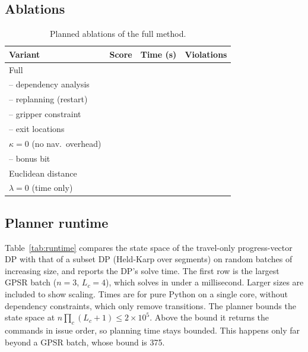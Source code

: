 \documentclass[conference]{IEEEtran}
\newcommand{\X}{}
\newcommand{\X}{\textcolor{red}{XX}}
\begin{document}
\subsection{Ablations}
\begin{table}[t]
\centering
\caption{Planned ablations of the full method.}
\label{tab:ablation}
\small
\begin{tabular}{lccc}
\toprule
Variant & Score & Time (s) & Violations \\
\midrule
Full                            & \X & \X & \X \\
-- dependency analysis          & \X & \X & \X \\
-- replanning (restart) & \X & \X & \X \\
-- gripper constraint           & \X & \X & \X \\
-- exit locations               & \X & \X & \X \\
$\kappa=0$ (no nav.\ overhead) & \X & \X & \X \\
-- bonus bit                    & \X & \X & \X \\
Euclidean distance & \X & \X & \X \\
$\lambda=0$ (time only)         & \X & \X & \X \\
\bottomrule
\end{tabular}
\end{table}

\subsection{Planner runtime}
Table~\ref{tab:runtime} compares the state space of the travel-only
progress-vector DP with that of a subset DP (Held-Karp over segments) on
random batches of increasing size, and reports the DP's solve time.
The first row is the largest
GPSR batch ($n=3$, $L_c=4$), which solves in under a millisecond. Larger sizes
are included to show scaling. Times are for pure Python on a single core,
without dependency constraints, which only remove transitions. The planner
bounds the state space at $n\prod_c(L_c+1)\le2\times10^5$. Above the bound it
returns the commands in issue order, so planning
time stays bounded. This happens only far beyond a GPSR batch, whose bound is
375.
\end{document}
